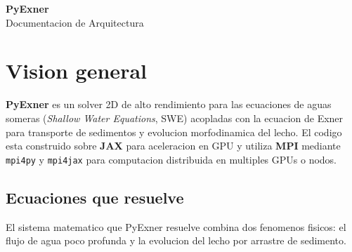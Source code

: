 \documentclass[11pt,a4paper]{article}
\newcommand{\code}[1]{\texttt{#1}}
\begin{document}
\begin{center}
  {\LARGE \textbf{PyExner}}\\[0.4em]
  {\Large Documentacion de Arquitectura}
\end{center}

\section{Vision general}

\textbf{PyExner} es un solver 2D de alto rendimiento para las ecuaciones de aguas someras\newline
(\emph{Shallow Water Equations}, SWE) acopladas con la ecuacion de Exner para transporte de\newline
sedimentos y evolucion morfodinamica del lecho. El codigo esta construido sobre \textbf{JAX} para
aceleracion en GPU y utiliza \textbf{MPI} mediante \code{mpi4py} y \code{mpi4jax} para computacion
distribuida en multiples GPUs o nodos.

\subsection{Ecuaciones que resuelve}

El sistema matematico que PyExner resuelve combina dos fenomenos fisicos: el flujo de agua poco
profunda y la evolucion del lecho por arrastre de sedimento.
\end{document}
